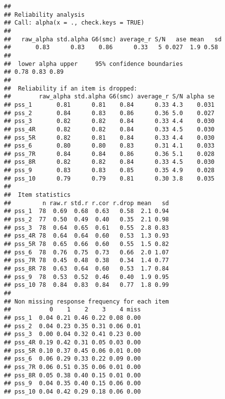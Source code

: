 \documentclass[]{article}
\newenvironment{Shaded}{\begin{snugshade}}{\end{snugshade}}
\newcommand{\KeywordTok}[1]{\textcolor[rgb]{0.13,0.29,0.53}{\textbf{#1}}}
\newcommand{\DataTypeTok}[1]{\textcolor[rgb]{0.13,0.29,0.53}{#1}}
\newcommand{\DecValTok}[1]{\textcolor[rgb]{0.00,0.00,0.81}{#1}}
\newcommand{\StringTok}[1]{\textcolor[rgb]{0.31,0.60,0.02}{#1}}
\newcommand{\CommentTok}[1]{\textcolor[rgb]{0.56,0.35,0.01}{\textit{#1}}}
\newcommand{\OtherTok}[1]{\textcolor[rgb]{0.56,0.35,0.01}{#1}}
\newcommand{\OperatorTok}[1]{\textcolor[rgb]{0.81,0.36,0.00}{\textbf{#1}}}
\newcommand{\NormalTok}[1]{#1}
\begin{document}
\begin{verbatim}
## 
## Reliability analysis   
## Call: alpha(x = ., check.keys = TRUE)
## 
##   raw_alpha std.alpha G6(smc) average_r S/N   ase mean   sd
##       0.83      0.83    0.86      0.33   5 0.027  1.9 0.58
## 
##  lower alpha upper     95% confidence boundaries
## 0.78 0.83 0.89 
## 
##  Reliability if an item is dropped:
##        raw_alpha std.alpha G6(smc) average_r S/N alpha se
## pss_1       0.81      0.81    0.84      0.33 4.3    0.031
## pss_2       0.84      0.83    0.86      0.36 5.0    0.027
## pss_3       0.82      0.82    0.84      0.33 4.4    0.030
## pss_4R      0.82      0.82    0.84      0.33 4.5    0.030
## pss_5R      0.82      0.81    0.84      0.33 4.4    0.030
## pss_6       0.80      0.80    0.83      0.31 4.1    0.033
## pss_7R      0.84      0.84    0.86      0.36 5.1    0.028
## pss_8R      0.82      0.82    0.84      0.33 4.5    0.030
## pss_9       0.83      0.83    0.85      0.35 4.9    0.028
## pss_10      0.79      0.79    0.81      0.30 3.8    0.035
## 
##  Item statistics 
##         n raw.r std.r r.cor r.drop mean   sd
## pss_1  78  0.69  0.68  0.63   0.58  2.1 0.94
## pss_2  77  0.50  0.49  0.40   0.35  2.1 0.98
## pss_3  78  0.64  0.65  0.61   0.55  2.8 0.83
## pss_4R 78  0.64  0.64  0.60   0.53  1.3 0.93
## pss_5R 78  0.65  0.66  0.60   0.55  1.5 0.82
## pss_6  78  0.76  0.75  0.73   0.66  2.0 1.07
## pss_7R 78  0.45  0.48  0.38   0.34  1.4 0.77
## pss_8R 78  0.63  0.64  0.60   0.53  1.7 0.84
## pss_9  78  0.53  0.52  0.46   0.40  1.9 0.95
## pss_10 78  0.84  0.83  0.84   0.77  1.8 0.99
## 
## Non missing response frequency for each item
##           0    1    2    3    4 miss
## pss_1  0.04 0.21 0.46 0.22 0.08 0.00
## pss_2  0.04 0.23 0.35 0.31 0.06 0.01
## pss_3  0.00 0.04 0.32 0.41 0.23 0.00
## pss_4R 0.19 0.42 0.31 0.05 0.03 0.00
## pss_5R 0.10 0.37 0.45 0.06 0.01 0.00
## pss_6  0.06 0.29 0.33 0.22 0.09 0.00
## pss_7R 0.06 0.51 0.35 0.06 0.01 0.00
## pss_8R 0.05 0.38 0.40 0.15 0.01 0.00
## pss_9  0.04 0.35 0.40 0.15 0.06 0.00
## pss_10 0.04 0.42 0.29 0.18 0.06 0.00
\end{verbatim}

\begin{Shaded}
\end{Shaded}
\end{document}
